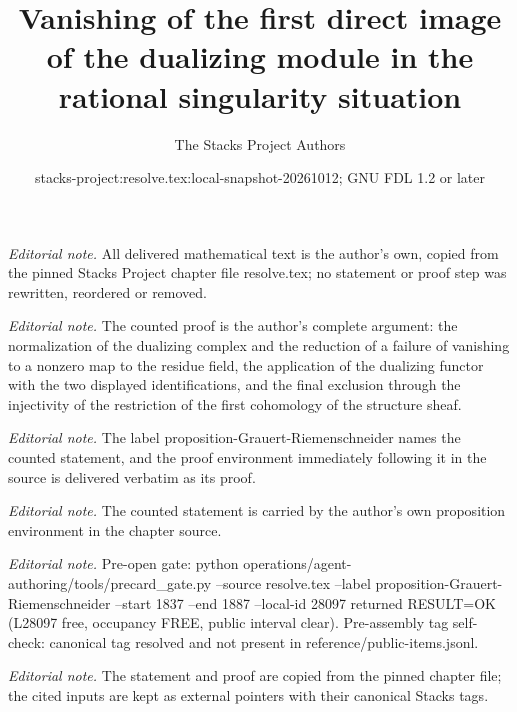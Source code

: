 \documentclass[10pt,a4paper]{amsart}
\title{Vanishing of the first direct image of the dualizing module in the rational singularity situation}
\author{The Stacks Project Authors}
\date{stacks-project:resolve.tex:local-snapshot-20261012; GNU FDL 1.2 or later}
\theoremstyle{plain}
\theoremstyle{definition}
\theoremstyle{remark}
\numberwithin{equation}{subsection}
\begin{document}
\maketitle
\noindent\textit{Editorial note.} All delivered mathematical text is the author's own, copied from the pinned Stacks Project chapter file resolve.tex; no statement or proof step was rewritten, reordered or removed.\par\medskip
\noindent\textit{Editorial note.} The counted proof is the author's complete argument: the normalization of the dualizing complex and the reduction of a failure of vanishing to a nonzero map to the residue field, the application of the dualizing functor with the two displayed identifications, and the final exclusion through the injectivity of the restriction of the first cohomology of the structure sheaf.\par\medskip
\noindent\textit{Editorial note.} The label proposition-Grauert-Riemenschneider names the counted statement, and the proof environment immediately following it in the source is delivered verbatim as its proof.\par\medskip
\noindent\textit{Editorial note.} The counted statement is carried by the author's own proposition environment in the chapter source.\par\medskip
\noindent\textit{Editorial note.} Pre-open gate: python operations/agent-authoring/tools/precard\_gate.py --source resolve.tex --label proposition-Grauert-Riemenschneider --start 1837 --end 1887 --local-id 28097 returned RESULT=OK (L28097 free, occupancy FREE, public interval clear). Pre-assembly tag self-check: canonical tag resolved and not present in reference/public-items.jsonl.\par\medskip
\noindent\textit{Editorial note.} The statement and proof are copied from the pinned chapter file; the cited inputs are kept as external pointers with their canonical Stacks tags.\par\medskip
\end{document}
